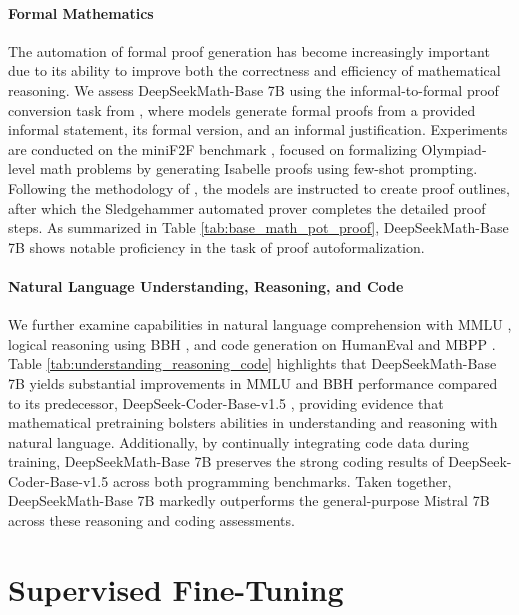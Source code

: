 \paragraph{Formal Mathematics}

The automation of formal proof generation has become increasingly important due to its ability to improve both the correctness and efficiency of mathematical reasoning. We assess DeepSeekMath-Base 7B using the informal-to-formal proof conversion task from \citep{dsp_proof}, where models generate formal proofs from a provided informal statement, its formal version, and an informal justification. Experiments are conducted on the miniF2F benchmark \citep{minif2f}, focused on formalizing Olympiad-level math problems by generating Isabelle proofs using few-shot prompting. Following the methodology of \cite{dsp_proof}, the models are instructed to create proof outlines, after which the Sledgehammer automated prover \citep{sledgehammer} completes the detailed proof steps. As summarized in Table \ref{tab:base_math_pot_proof}, DeepSeekMath-Base 7B shows notable proficiency in the task of proof autoformalization.

\paragraph{Natural Language Understanding, Reasoning, and Code}

We further examine capabilities in natural language comprehension with MMLU \citep{mmlu}, logical reasoning using BBH \citep{bbh}, and code generation on HumanEval \citep{codex} and MBPP \citep{mbpp}. Table \ref{tab:understanding_reasoning_code} highlights that DeepSeekMath-Base 7B yields substantial improvements in MMLU and BBH performance compared to its predecessor, DeepSeek-Coder-Base-v1.5 \citep{deepseek-coder}, providing evidence that mathematical pretraining bolsters abilities in understanding and reasoning with natural language. Additionally, by continually integrating code data during training, DeepSeekMath-Base 7B preserves the strong coding results of DeepSeek-Coder-Base-v1.5 across both programming benchmarks. Taken together, DeepSeekMath-Base 7B markedly outperforms the general-purpose Mistral 7B \citep{mistral} across these reasoning and coding assessments.

\section{Supervised Fine-Tuning}

